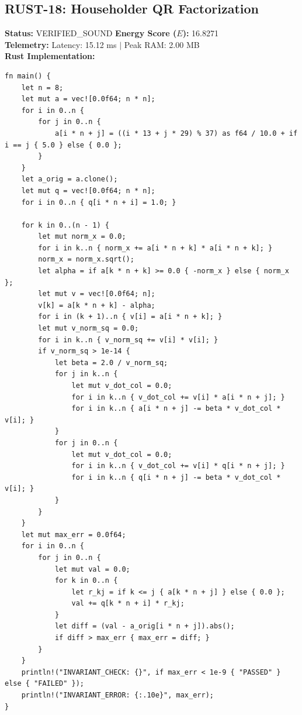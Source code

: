 \documentclass[11pt, a4paper]{article}
\begin{document}
\subsection{RUST-18: Householder QR Factorization}
\textbf{Status:} VERIFIED\_SOUND \hfill \textbf{Energy Score ($E$):} 16.8271\\
\textbf{Telemetry:} Latency: 15.12 ms $|$ Peak RAM: 2.00 MB\\
\textbf{Rust Implementation:}
\begin{verbatim}
fn main() {
    let n = 8;
    let mut a = vec![0.0f64; n * n];
    for i in 0..n {
        for j in 0..n {
            a[i * n + j] = ((i * 13 + j * 29) % 37) as f64 / 10.0 + if i == j { 5.0 } else { 0.0 };
        }
    }
    let a_orig = a.clone();
    let mut q = vec![0.0f64; n * n];
    for i in 0..n { q[i * n + i] = 1.0; }

    for k in 0..(n - 1) {
        let mut norm_x = 0.0;
        for i in k..n { norm_x += a[i * n + k] * a[i * n + k]; }
        norm_x = norm_x.sqrt();
        let alpha = if a[k * n + k] >= 0.0 { -norm_x } else { norm_x };
        let mut v = vec![0.0f64; n];
        v[k] = a[k * n + k] - alpha;
        for i in (k + 1)..n { v[i] = a[i * n + k]; }
        let mut v_norm_sq = 0.0;
        for i in k..n { v_norm_sq += v[i] * v[i]; }
        if v_norm_sq > 1e-14 {
            let beta = 2.0 / v_norm_sq;
            for j in k..n {
                let mut v_dot_col = 0.0;
                for i in k..n { v_dot_col += v[i] * a[i * n + j]; }
                for i in k..n { a[i * n + j] -= beta * v_dot_col * v[i]; }
            }
            for j in 0..n {
                let mut v_dot_col = 0.0;
                for i in k..n { v_dot_col += v[i] * q[i * n + j]; }
                for i in k..n { q[i * n + j] -= beta * v_dot_col * v[i]; }
            }
        }
    }
    let mut max_err = 0.0f64;
    for i in 0..n {
        for j in 0..n {
            let mut val = 0.0;
            for k in 0..n {
                let r_kj = if k <= j { a[k * n + j] } else { 0.0 };
                val += q[k * n + i] * r_kj;
            }
            let diff = (val - a_orig[i * n + j]).abs();
            if diff > max_err { max_err = diff; }
        }
    }
    println!("INVARIANT_CHECK: {}", if max_err < 1e-9 { "PASSED" } else { "FAILED" });
    println!("INVARIANT_ERROR: {:.10e}", max_err);
}
\end{verbatim}
\end{document}
